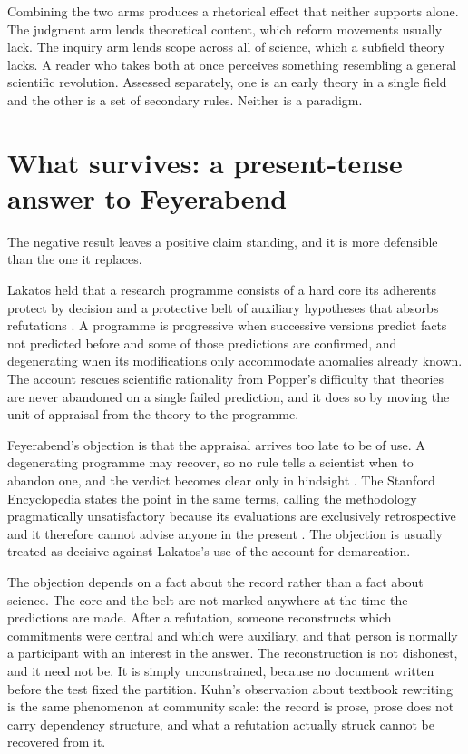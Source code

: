 \documentclass[11pt,letterpaper]{article}
\begin{document}
Combining the two arms produces a rhetorical effect that neither supports alone.
The judgment arm lends theoretical content, which reform movements usually lack.
The inquiry arm lends scope across all of science, which a subfield theory lacks.
A reader who takes both at once perceives something resembling a general
scientific revolution. Assessed separately, one is an early theory in a single
field and the other is a set of secondary rules. Neither is a paradigm.

\section{What survives: a present-tense answer to Feyerabend}

The negative result leaves a positive claim standing, and it is more defensible
than the one it replaces.

Lakatos held that a research programme consists of a hard core its adherents
protect by decision and a protective belt of auxiliary hypotheses that absorbs
refutations \citep{lakatos1970}. A programme is progressive when successive
versions predict facts not predicted before and some of those predictions are
confirmed, and degenerating when its modifications only accommodate anomalies
already known. The account rescues scientific rationality from Popper's
difficulty that theories are never abandoned on a single failed prediction, and
it does so by moving the unit of appraisal from the theory to the programme.

Feyerabend's objection is that the appraisal arrives too late to be of use. A
degenerating programme may recover, so no rule tells a scientist when to abandon
one, and the verdict becomes clear only in hindsight \citep{feyerabend1975}. The
Stanford Encyclopedia states the point in the same terms, calling the
methodology pragmatically unsatisfactory because its evaluations are exclusively
retrospective and it therefore cannot advise anyone in the present
\citep{seplakatos}. The objection is usually treated as decisive against
Lakatos's use of the account for demarcation.

The objection depends on a fact about the record rather than a fact about
science. The core and the belt are not marked anywhere at the time the
predictions are made. After a refutation, someone reconstructs which commitments
were central and which were auxiliary, and that person is normally a participant
with an interest in the answer. The reconstruction is not dishonest, and it need
not be. It is simply unconstrained, because no document written before the test
fixed the partition. Kuhn's observation about textbook rewriting is the same
phenomenon at community scale: the record is prose, prose does not carry
dependency structure, and what a refutation actually struck cannot be recovered
from it.
\end{document}
